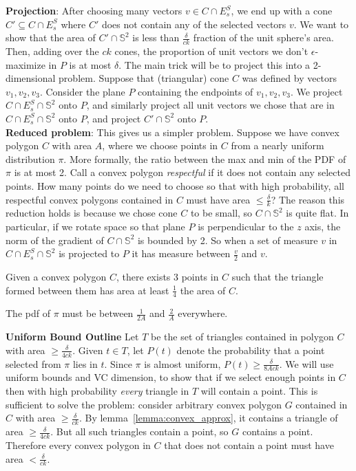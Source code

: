 \textbf{Projection}: After choosing many vectors $v \in C \cap E^S_s$, we end up with a cone $C' \subseteq C \cap E^S_s$ where $C'$ does not contain any of the selected vectors $v$. We want to show that the area of $C' \cap \mathbb {S}^2$ is less than $\frac{\delta}{ck}$ fraction of the unit sphere's area. Then, adding over the $ck$ cones, the proportion of unit vectors we don't $\epsilon$-maximize in $P$ is at most $\delta$. The main trick will be to project this into a 2-dimensional problem. Suppose that (triangular) cone $C$ was defined by vectors $v_1, v_2, v_3$. Consider the plane $P$ containing the endpoints of $v_1, v_2, v_3$. We project $C \cap E^S_s \cap \mathbb {S}^2$ onto $P$, and similarly project all unit vectors we chose that are in $C \cap E^S_s \cap \mathbb {S}^2$ onto $P$, and project $C' \cap \mathbb {S}^2$ onto $P$. 
\\

\textbf{Reduced problem}: This gives us a simpler problem. Suppose we have convex polygon $C$ with area $A$, where we choose points in $C$ from a nearly uniform distribution $\pi$. More formally, the ratio between the max and min of the PDF of $\pi$ is at most 2. Call a convex polygon \emph{respectful} if it does not contain any selected points. How many points do we need to choose so that with high probability, all respectful convex polygons contained in $C$ must have area $\leq \frac{\delta}{k}$? The reason this reduction holds is because we chose cone $C$ to be small, so $C \cap \mathbb {S}^2$ is quite flat. In particular, if we rotate space so that plane $P$ is perpendicular to the $z$ axis, the norm of the gradient of $C \cap \mathbb {S}^2$ is bounded by 2. So when a set of measure $v$ in $C \cap E^S_s \cap \mathbb {S}^2$ is projected to $P$ it has measure between $\frac{v}{2}$ and $v$.

\begin{lemma}
Given a convex polygon $C$, there exists 3 points in $C$ such that the triangle formed between them has area at least $\frac{1}{4}$ the area of $C$.
\label{lemma:convex_approx}
\end{lemma}

\begin{lemma}
The pdf of $\pi$ must be between $\frac{1}{2A}$ and $\frac{2}{A}$ everywhere.
\end{lemma}

\textbf{Uniform Bound Outline} Let $T$ be the set of triangles contained in polygon $C$ with area $\geq \frac{\delta}{4ck}$.  Given $t \in T$, let $P(t)$ denote the probability that a point selected from $\pi$ lies in $t$. Since $\pi$ is almost uniform, $P(t) \geq \frac{\delta}{8Ack}$. We will use uniform bounds and VC dimension, to show that if we select enough points in $C$ then with high probability \emph{every} triangle in $T$ will contain a point. This is sufficient to solve the problem: consider arbitrary convex polygon $G$ contained in $C$ with area $\geq \frac{\delta}{ck}$. By lemma~\ref{lemma:convex_approx}, it contains a triangle of area $\geq \frac{\delta}{4ck}$. But all such triangles contain a point, so $G$ contains a point. Therefore every convex polygon in $C$ that does not contain a point must have area $< \frac{\delta}{ck}$.
\\

